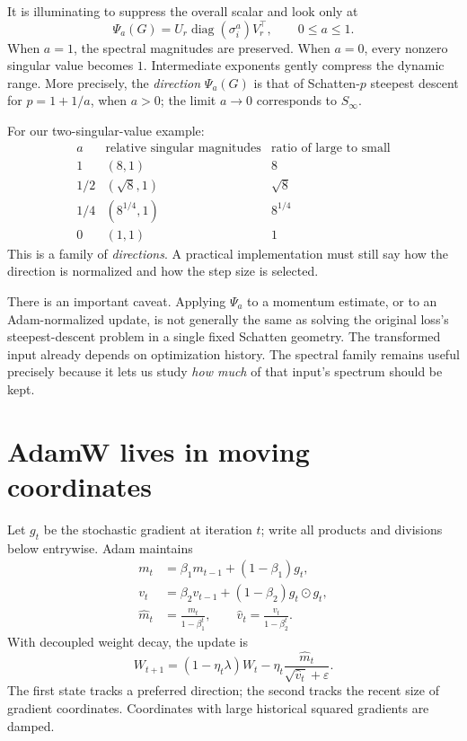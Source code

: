 It is illuminating to suppress the overall scalar and look only at
\[
 \Psi_a(G)=U_r\operatorname{diag}(\sigma_i^a)V_r^\top,
 \qquad 0\leq a\leq1.
\]
When \(a=1\), the spectral magnitudes are preserved.  When \(a=0\), every nonzero singular value becomes \(1\).  Intermediate exponents gently compress the dynamic range.  More precisely, the \emph{direction} \(\Psi_a(G)\) is that of Schatten-\(p\) steepest descent for \(p=1+1/a\), when \(a>0\); the limit \(a\to0\) corresponds to \(S_\infty\).

For our two-singular-value example:
\[
 \begin{array}{c|c|c}
 a&\text{relative singular magnitudes}&
         \text{ratio of large to small}\\ \hline
 1&(8,1)&8\\
 1/2&(\sqrt8,1)&\sqrt8\\
 1/4&(8^{1/4},1)&8^{1/4}\\
 0&(1,1)&1
 \end{array}
\]
This is a family of \emph{directions}.  A practical implementation must still say how the direction is normalized and how the step size is selected.

There is an important caveat.  Applying \(\Psi_a\) to a momentum estimate, or to an Adam-normalized update, is not generally the same as solving the original loss's steepest-descent problem in a single fixed Schatten geometry.  The transformed input already depends on optimization history.  The spectral family remains useful precisely because it lets us study \emph{how much} of that input's spectrum should be kept.

\section{AdamW lives in moving coordinates}

Let \(g_t\) be the stochastic gradient at iteration \(t\); write all products and divisions below entrywise.  Adam maintains
\[
 \begin{aligned}
 m_t&=\beta_1m_{t-1}+(1-\beta_1)g_t,\\
 v_t&=\beta_2v_{t-1}+(1-\beta_2)g_t\odot g_t,\\
 \widehat m_t&=\frac{m_t}{1-\beta_1^t},
 \qquad
 \widehat v_t=\frac{v_t}{1-\beta_2^t}.
 \end{aligned}
\]
With decoupled weight decay, the update is
\begin{equation}
 W_{t+1}=(1-\eta_t\lambda)W_t
 -\eta_t\frac{\widehat m_t}{\sqrt{\widehat v_t}+\varepsilon}.
 \label{eq:N20261017-adamw}
\end{equation}
The first state tracks a preferred direction; the second tracks the recent size of gradient coordinates.  Coordinates with large historical squared gradients are damped.


